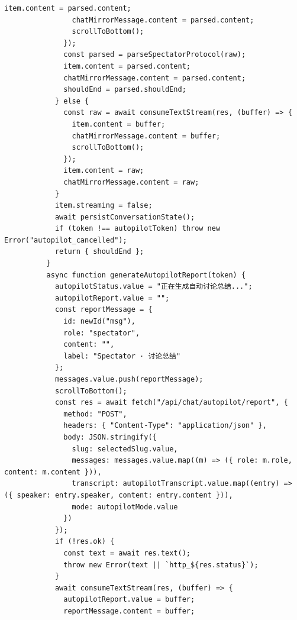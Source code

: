\documentclass[12pt,a4paper]{article}
\begin{document}
\newpage
{}
\fancyhead[R]{}
\begin{Verbatim}[fontsize=\footnotesize]
                item.content = parsed.content;
                chatMirrorMessage.content = parsed.content;
                scrollToBottom();
              });
              const parsed = parseSpectatorProtocol(raw);
              item.content = parsed.content;
              chatMirrorMessage.content = parsed.content;
              shouldEnd = parsed.shouldEnd;
            } else {
              const raw = await consumeTextStream(res, (buffer) => {
                item.content = buffer;
                chatMirrorMessage.content = buffer;
                scrollToBottom();
              });
              item.content = raw;
              chatMirrorMessage.content = raw;
            }
            item.streaming = false;
            await persistConversationState();
            if (token !== autopilotToken) throw new Error("autopilot_cancelled");
            return { shouldEnd };
          }
          async function generateAutopilotReport(token) {
            autopilotStatus.value = "正在生成自动讨论总结...";
            autopilotReport.value = "";
            const reportMessage = {
              id: newId("msg"),
              role: "spectator",
              content: "",
              label: "Spectator · 讨论总结"
            };
            messages.value.push(reportMessage);
            scrollToBottom();
            const res = await fetch("/api/chat/autopilot/report", {
              method: "POST",
              headers: { "Content-Type": "application/json" },
              body: JSON.stringify({
                slug: selectedSlug.value,
                messages: messages.value.map((m) => ({ role: m.role, content: m.content })),
                transcript: autopilotTranscript.value.map((entry) => ({ speaker: entry.speaker, content: entry.content })),
                mode: autopilotMode.value
              })
            });
            if (!res.ok) {
              const text = await res.text();
              throw new Error(text || `http_${res.status}`);
            }
            await consumeTextStream(res, (buffer) => {
              autopilotReport.value = buffer;
              reportMessage.content = buffer;
\end{Verbatim}
\newpage
{}
\fancyhead[R]{}
\end{document}

